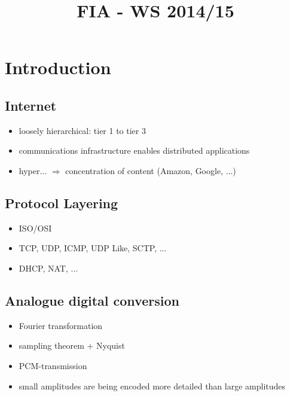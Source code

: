 \documentclass[a4paper,10pt]{scrreprt}
\title{FIA - WS 2014/15}
\author{}
\date{}
\begin{document}
\maketitle

\chapter{Introduction}
\section{Internet}

\begin{itemize}
 \item loosely hierarchical: tier 1 to tier 3
 \item communications infrastructure enables distributed applications
 \item hyper... $\Rightarrow$ concentration of content (Amazon, Google, ...)
\end{itemize}

\section{Protocol Layering}
\begin{itemize}
 \item ISO/OSI
 \item TCP, UDP, ICMP, UDP Like, SCTP, ...
 \item DHCP, NAT, ...
\end{itemize}

\section{Analogue digital conversion}
\begin{itemize}
 \item Fourier transformation 
 \item sampling theorem + Nyquist
 \item PCM-transmission 
 \item small amplitudes are being encoded more detailed than large amplitudes
\end{itemize}
\end{document}
